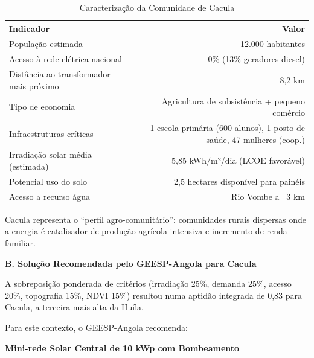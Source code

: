 \documentclass[12pt, a4paper]{article}
\begin{document}
\begin{table}[H]
\centering
\caption{Caracterização da Comunidade de Cacula}
\label{tab:cacula_profile}
\small
\begin{tabular}{|l|r|}
\hline
\textbf{Indicador} & \textbf{Valor} \\
\hline
População estimada & 12.000 habitantes \\
Acesso à rede elétrica nacional & 0\% (13\% geradores diesel) \\
Distância ao transformador mais próximo & 8,2 km \\
Tipo de economia & Agricultura de subsistência + pequeno comércio \\
Infraestruturas críticas & 1 escola primária (600 alunos), 1 posto de saúde, 47 mulheres (coop.) \\
Irradiação solar média (estimada) & 5,85 kWh/m²/dia (LCOE favorável) \\
Potencial uso do solo & 2,5 hectares disponível para painéis \\
Acesso a recurso água & Rio Vombe a ~3 km \\
\hline
\end{tabular}
\end{table}

Cacula representa o ``perfil agro-comunitário'': comunidades rurais dispersas onde a energia 
é catalisador de produção agrícola intensiva e incremento de renda familiar.

\textbf{B. Solução Recomendada pelo GEESP-Angola para Cacula}

A sobreposição ponderada de critérios (irradiação 25\%, demanda 25\%, acesso 20\%, 
topografia 15\%, NDVI 15\%) resultou numa aptidão integrada de 0,83 para Cacula, a terceira 
mais alta da Huíla.

Para este contexto, o GEESP-Angola recomenda:

\textbf{Mini-rede Solar Central de 10 kWp com Bombeamento}
\end{document}
